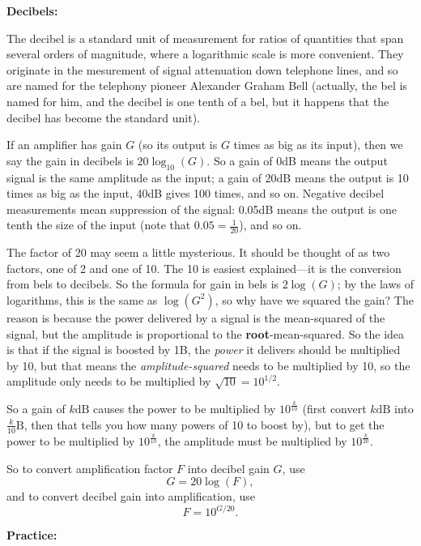 \documentclass{article}
\begin{document}
\clearpage



\textbf{Decibels:}\bigskip


The decibel is a standard unit of measurement for ratios of quantities that span several orders of magnitude, where a logarithmic scale is more convenient. They originate in the mesurement of signal attenuation down telephone lines, and so are named for the telephony pioneer Alexander Graham Bell (actually, the bel is named for him, and the decibel is one tenth of a bel, but it happens that the decibel has become the standard unit).

If an amplifier has gain $G$ (so its output is $G$ times as big as its input), then we say the gain in decibels is $20\log_{10}(G)$. So a gain of 0dB means the output signal is the same amplitude as the input; a gain of 20dB means the output is 10 times as big as the input, 40dB gives 100 times, and so on. Negative decibel measurements mean suppression of the signal: 0.05dB means the output is one tenth the size of the input (note that $0.05=\frac{1}{20}$), and so on.

The factor of 20 may seem a little mysterious. It should be thought of as two factors, one of 2 and one of 10. The 10 is easiest explained---it is the conversion from bels to decibels. So the formula for gain in bels is $2\log(G)$; by the laws of logarithms, this is the same as $\log(G^2)$, so why have we squared the gain? The reason is because the power delivered by a signal is the mean-squared of the signal, but the amplitude is proportional to the \textbf{root}-mean-squared. So the idea is that if the signal is boosted by 1B, the \textit{power} it delivers should be multiplied by 10, but that means the \textit{amplitude-squared} needs to be multiplied by 10, so the amplitude only needs to be multiplied by $\sqrt{10}=10^{1/2}$.

So a gain of $k\mathrm{dB}$ causes the power to be multiplied by $10^{\frac{k}{10}}$ (first convert $k\mathrm{dB}$ into $\frac{k}{10}\mathrm{B}$, then that tells you how many powers of 10 to boost by), but to get the power to be multiplied by $10^{\frac{k}{10}}$, the amplitude must be multiplied by $10^{\frac{k}{20}}$.\bigskip

So to convert amplification factor $F$ into decibel gain $G$, use
\[G=20\log(F),\]
and to convert decibel gain into amplification, use
\[F=10^{G/20}.\]

\clearpage



\textbf{Practice:}\bigskip
\end{document}
